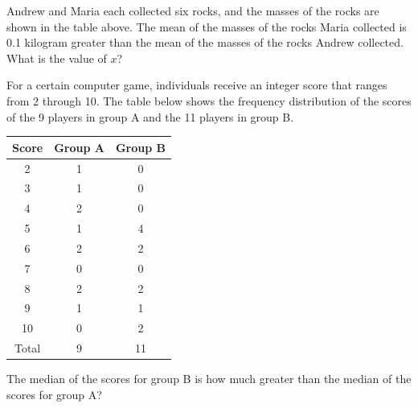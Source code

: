 \vspace{1em}

Andrew and Maria each collected six rocks, and the masses of the rocks are shown in the table above.  
The mean of the masses of the rocks Maria collected is 0.1 kilogram greater than the mean of the masses of the rocks Andrew collected.  
What is the value of $x$?


\newpage

\noindent\markforreview
\vspace{1em}

For a certain computer game, individuals receive an integer score that ranges from 2 through 10.  
The table below shows the frequency distribution of the scores of the 9 players in group A and the 11 players in group B.

\vspace{1em}
\begin{center}
    

\begin{tabular}{|c|c|c|}
\hline
Score & Group A & Group B \\
\hline
2 & 1 & 0 \\
3 & 1 & 0 \\
4 & 2 & 0 \\
5 & 1 & 4 \\
6 & 2 & 2 \\
7 & 0 & 0 \\
8 & 2 & 2 \\
9 & 1 & 1 \\
10 & 0 & 2 \\
\hline
Total & 9 & 11 \\
\hline
\end{tabular}
\end{center}

\vspace{1em}

The median of the scores for group B is how much greater than the median of the scores for group A?

\vspace{0.75em}





\newpage

